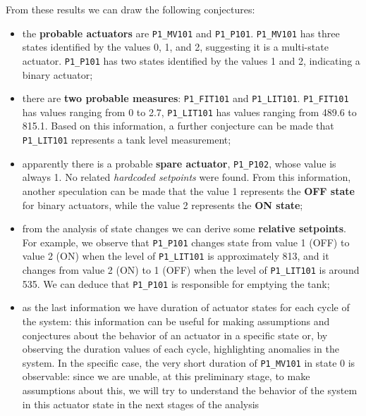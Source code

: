From these results we can draw the following conjectures: 

\begin{itemize}
	\item the \textbf{probable actuators} are \texttt{P1\_MV101} and \texttt{P1\_P101}. \texttt{P1\_MV101} has three states identified by the values 0, 1, and 2, suggesting it is a multi-state actuator. \texttt{P1\_P101} has two states identified by the values 1 and 2, indicating a binary actuator;
	
	\item there are \textbf{two probable measures}: \texttt{P1\_FIT101} and \texttt{P1\_LIT101}. \texttt{P1\_FIT101} has values ranging from 0 to 2.7, \texttt{P1\_LIT101} has values ranging from 489.6 to 815.1. Based on this information, a further conjecture can be made that \texttt{P1\_LIT101} represents a tank level measurement;
		
	\item apparently there is a probable \textbf{spare actuator}, \texttt{P1\_P102}, whose value is always 1. No related \textit{hardcoded setpoints} were found. From this information, another speculation can be made that the value 1 represents the \textbf{OFF state} for binary actuators, while the value 2 represents the \textbf{ON state};
	
	\item from the analysis of state changes we can derive some \textbf{relative setpoints}. For example, we observe that \texttt{P1\_P101} changes state from value 1 (OFF) to value 2 (ON) when the level of \texttt{P1\_LIT101} is approximately 813, and it changes from value 2 (ON) to 1 (OFF) when the level of \texttt{P1\_LIT101} is around 535. We can deduce that \texttt{P1\_P101} is responsible for emptying the tank;
	
	\item as the last information we have duration of actuator states for each cycle of the system: this information can be useful for making assumptions and conjectures about the behavior of an actuator in a specific state or, by observing the duration values of each cycle, highlighting anomalies in the system.\newline
	In the specific case, the very short duration of \texttt{P1\_MV101} in state 0 is observable: since we are unable, at this preliminary stage, to make assumptions about this, we will try to understand the behavior of the system in this actuator state in the next stages of the analysis
\end{itemize}

